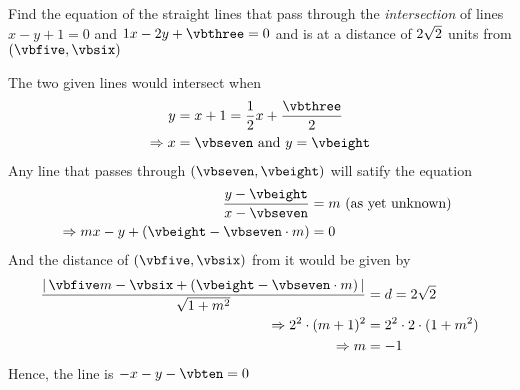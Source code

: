 \question Find the equation of the straight lines that pass through the \textit{intersection} of lines 
$x-y+1 = 0$ and $\vbone x - \vbtwo y + \vbthree = 0$ and is at a distance of 
$2\sqrt{2}$ units from $(\vbfive, \vbsix)$

\insertQR{}

\watchout

\ifprintanswers

\fi 

\begin{solution}
	The two given lines would intersect when
	\begin{align}
		y &= x + 1 = \dfrac{\vbone}{\vbtwo}x + \dfrac{\vbthree}{\vbtwo} \\
		\Rightarrow x &= \vbseven \text{ and } y = \vbeight
	\end{align}
	Any line that passes through $(\vbseven, \vbeight)$ will satify the equation
	\begin{align}
		\dfrac{y-\vbeight}{x-\vbseven} &= m \text{ (as yet unknown) } \\
		\Rightarrow mx - y + (\vbeight - \vbseven \cdot m) &= 0
	\end{align}
	And the distance of $(\vbfive, \vbsix)$ from it would be given by 
	\begin{align}
		\dfrac{\vert\, \vbfive m - \vbsix + (\vbeight - \vbseven\cdot m)\,\vert}{\sqrt{1 + m^2}} &= d = \vbfour\sqrt{2}\\
		\Rightarrow \vbfour^2\cdot(m+1)^2 &= \vbfour^2\cdot 2\cdot(1 + m^2) \\
		\Rightarrow m &= -1 
	\end{align}
	Hence, the line is $-x-y-\vbten = 0$
\end{solution}
